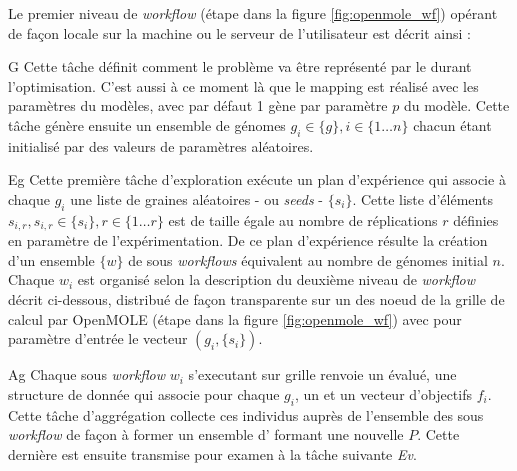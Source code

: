 Le premier niveau de \textit{workflow} (étape  dans la figure \ref{fig:openmole_wf}) opérant de façon locale sur la machine ou le serveur de l'utilisateur est décrit ainsi :


\begin{myitemize}

\item[G] Cette tâche définit comment le problème va être représenté par le  durant l'optimisation. C'est aussi à ce moment là que le mapping est réalisé avec les paramètres du modèles, avec par défaut 1 gène par paramètre $p$ du modèle. Cette tâche génère ensuite un ensemble de génomes $g_i \in \{g\}, i \in \{1 \dotsc n\}$ chacun étant initialisé par des valeurs de paramètres aléatoires.

\item[Eg] Cette première tâche d'exploration exécute un plan d'expérience qui associe à chaque  $g_i$ une liste de graines aléatoires  - ou \textit{seeds} - $\{s_i\}$. Cette liste d'éléments $s_{i,r} , s_{i,r} \in \{s_i\}, r \in \{1 \dotsc r\}$ est de taille égale au nombre de réplications $r$ définies en paramètre de l'expérimentation. De ce plan d'expérience résulte la création d'un ensemble $\{w\}$ de sous \textit{workflows} équivalent au nombre de génomes initial $n$. Chaque $w_i$ est organisé selon la description du deuxième niveau de \textit{workflow} décrit ci-dessous, distribué de façon transparente sur un des noeud de la grille de calcul par OpenMOLE (étape  dans la figure \ref{fig:openmole_wf}) avec pour paramètre d'entrée le vecteur $(g_i, \{s_i\})$.

\item[Ag] Chaque sous \textit{workflow} $w_i$ s'executant sur grille renvoie un  évalué, une structure de donnée qui associe pour chaque  $g_i$, un  et un vecteur d'objectifs $f_i$. Cette tâche d'aggrégation collecte ces individus auprès de l'ensemble des sous \textit{workflow} de façon à former un ensemble d' formant une nouvelle  $P$. Cette dernière est ensuite transmise pour examen à la tâche suivante \textit{Ev}.


\end{myitemize}
